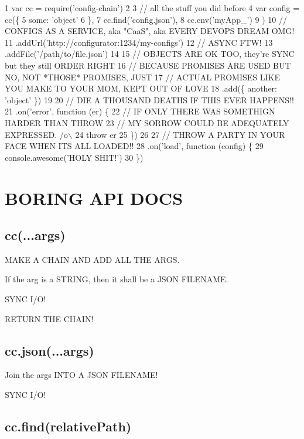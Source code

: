 \begin{DoxyCode}
1 var cc = require('config-chain')
2 
3 // all the stuff you did before
4 var config = cc(\{
5       some: 'object'
6     \},
7     cc.find('config.json'),
8     cc.env('myApp\_')
9   )
10   // CONFIGS AS A SERVICE, aka "CaaS", aka EVERY DEVOPS DREAM OMG!
11   .addUrl('http://configurator:1234/my-configs')
12   // ASYNC FTW!
13   .addFile('/path/to/file.json')
14 
15   // OBJECTS ARE OK TOO, they're SYNC but they still ORDER RIGHT
16   // BECAUSE PROMISES ARE USED BUT NO, NOT *THOSE* PROMISES, JUST
17   // ACTUAL PROMISES LIKE YOU MAKE TO YOUR MOM, KEPT OUT OF LOVE
18   .add(\{ another: 'object' \})
19 
20   // DIE A THOUSAND DEATHS IF THIS EVER HAPPENS!!
21   .on('error', function (er) \{
22     // IF ONLY THERE WAS SOMETHIGN HARDER THAN THROW
23     // MY SORROW COULD BE ADEQUATELY EXPRESSED.  /o\(\backslash\)
24     throw er
25   \})
26 
27   // THROW A PARTY IN YOUR FACE WHEN ITS ALL LOADED!!
28   .on('load', function (config) \{
29     console.awesome('HOLY SHIT!')
30   \})
\end{DoxyCode}


\section*{B\+O\+R\+I\+N\+G A\+P\+I D\+O\+C\+S}

\subsection*{cc(...args)}

M\+A\+K\+E A C\+H\+A\+I\+N A\+N\+D A\+D\+D A\+L\+L T\+H\+E A\+R\+G\+S.

If the arg is a S\+T\+R\+I\+N\+G, then it shall be a J\+S\+O\+N F\+I\+L\+E\+N\+A\+M\+E.

S\+Y\+N\+C I/\+O!

R\+E\+T\+U\+R\+N T\+H\+E C\+H\+A\+I\+N!

\subsection*{cc.\+json(...args)}

Join the args I\+N\+T\+O A J\+S\+O\+N F\+I\+L\+E\+N\+A\+M\+E!

S\+Y\+N\+C I/\+O!

\subsection*{cc.\+find(relative\+Path)}

